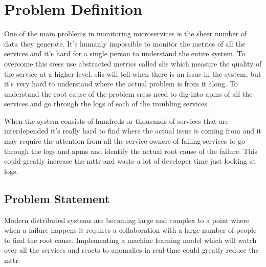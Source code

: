 \section{Problem Definition}

One of the main problems in monitoring microservices is the sheer number of data they generate. It's humanly impossible to monitor the metrics of all the services and it's hard for a single person to understand the entire system. To overcome this \acp{sres} use abstracted metrics called \acp{sli} which measure the quality of the service at a higher level. \acp{sli} will tell when there is an issue in the system, but it's very hard to understand where the actual problem is from it along. To understand the root cause of the problem \acp{sres} need to dig into \acp{apm} of all the services and go through the logs of each of the troubling services.

When the system consists of hundreds or thousands of services that are interdepended it's really hard to find where the actual issue is coming from and it may require the attention from all the service owners of failing services to go through the logs and \acp{apm} and identify the actual root cause of the failure. This could greatly increase the \ac{mttr} and waste a lot of developer time just looking at logs.

\subsection{Problem Statement}

Modern distributed systems are becoming large and complex to a point where when a failure happens it requires a collaboration with a large number of people to find the root cause.  Implementing a machine learning model which will watch over all the services and reacts to anomalies in real-time could greatly reduce the \ac{mttr}